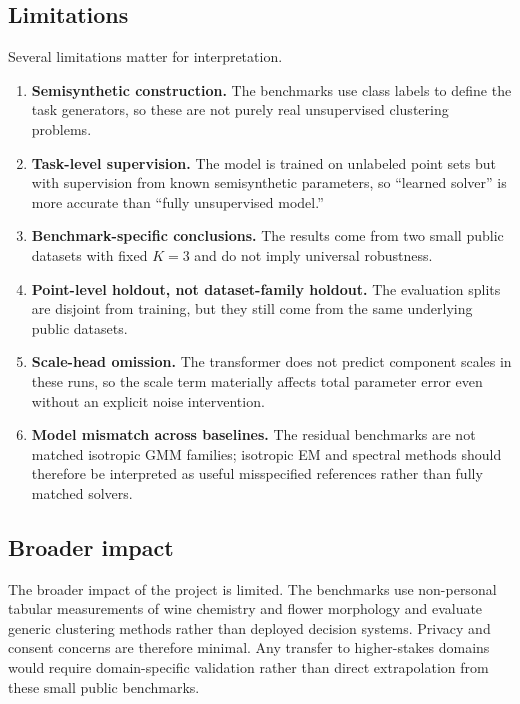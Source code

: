 \documentclass{article}
\begin{document}
\subsection{Limitations}
Several limitations matter for interpretation.
\begin{enumerate}[leftmargin=1.4em]
    \item \textbf{Semisynthetic construction.} The benchmarks use class labels to define the task generators, so these are not purely real unsupervised clustering problems.
    \item \textbf{Task-level supervision.} The model is trained on unlabeled point sets but with supervision from known semisynthetic parameters, so ``learned solver'' is more accurate than ``fully unsupervised model.''
    \item \textbf{Benchmark-specific conclusions.} The results come from two small public datasets with fixed $K=3$ and do not imply universal robustness.
    \item \textbf{Point-level holdout, not dataset-family holdout.} The evaluation splits are disjoint from training, but they still come from the same underlying public datasets.
    \item \textbf{Scale-head omission.} The transformer does not predict component scales in these runs, so the scale term materially affects total parameter error even without an explicit noise intervention.
    \item \textbf{Model mismatch across baselines.} The residual benchmarks are not matched isotropic GMM families; isotropic EM and spectral methods should therefore be interpreted as useful misspecified references rather than fully matched solvers.
\end{enumerate}

\subsection{Broader impact}
The broader impact of the project is limited. The benchmarks use non-personal tabular measurements of wine chemistry and flower morphology and evaluate generic clustering methods rather than deployed decision systems. Privacy and consent concerns are therefore minimal. Any transfer to higher-stakes domains would require domain-specific validation rather than direct extrapolation from these small public benchmarks.
\end{document}
